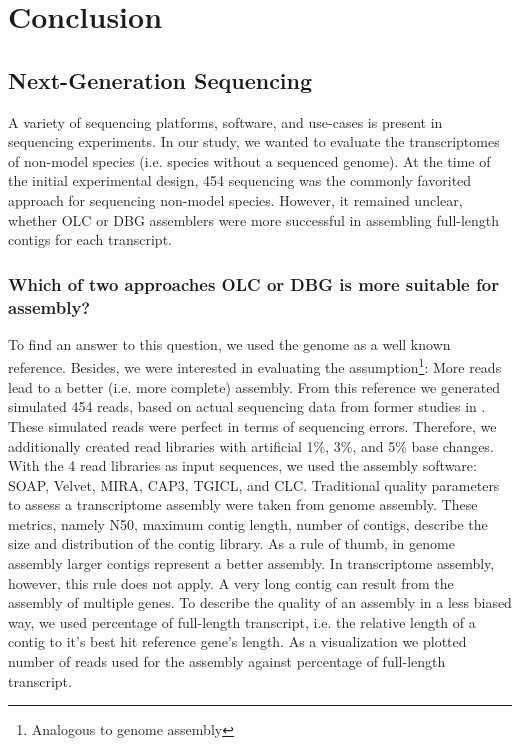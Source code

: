 \chapter{Conclusion}
 \section{Next-Generation Sequencing}
	A variety of sequencing platforms, software, and use-cases is present in sequencing experiments.
	In our study, we wanted to evaluate the transcriptomes of non-model species (i.e. species without a sequenced genome).
	At the time of the initial experimental design, 454 sequencing was the commonly favorited approach for sequencing non-model species.
	However, it remained unclear, whether \ac{OLC} or \ac{DBG} assemblers were more successful in assembling full-length contigs for each transcript.
	\subsection{Which of two approaches \ac{OLC} or \ac{DBG} is more suitable for  assembly?}
	To find an answer to this question, we used the  genome as a well known reference.
	Besides, we were interested in evaluating the assumption\footnote{Analogous to genome assembly}: More reads lead to a better (i.e. more complete) assembly.
	From this reference we generated simulated 454 reads, based on actual sequencing data from former studies in  \cite{op_Braeutigam2010}.
	These simulated reads were perfect in terms of sequencing errors.
	Therefore, we additionally created read libraries with artificial 1\%, 3\%, and 5\% base changes.
	With the 4 read libraries as input sequences, we used the assembly software:     \ac{SOAP}\cite{unknown}, \ac{Velvet}\cite{unknown}, \ac{MIRA}\cite{unknown}, \ac{CAP3}\cite{unknown}, \ac{TGICL}\cite{unknown}, and \ac{CLC}\cite{CLC}.
	Traditional quality parameters to assess a  transcriptome assembly were taken from genome assembly.
	These metrics, namely N50, maximum contig length, number of contigs, describe the size and distribution of the contig library.
	As a rule of thumb, in genome assembly larger contigs represent a better assembly.
	In transcriptome assembly, however, this rule does not apply.
	A very long contig can result from the assembly of multiple genes.
	To describe the quality of an assembly in a less biased way, we used percentage of full-length transcript, i.e. the relative length of a contig to it's best hit reference gene's length.
	As a visualization we plotted number of reads used for the assembly against percentage of full-length transcript.
	
